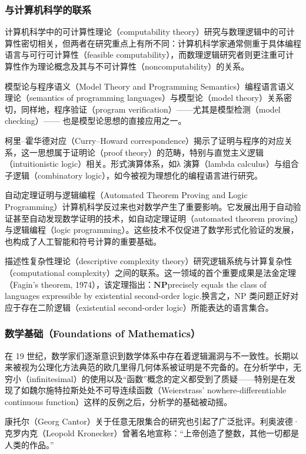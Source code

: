 \subsubsection{与计算机科学的联系}
计算机科学中的可计算性理论（computability theory）研究与数理逻辑中的可计算性密切相关，但两者在研究重点上有所不同：计算机科学家通常侧重于具体编程语言与可行可计算性（feasible computability），而数理逻辑研究者则更注重可计算性作为理论概念及其与不可计算性（noncomputability）的关系。

模型论与程序语义（Model Theory and Programming Semantics）编程语言语义理论（semantics of programming languages）与模型论（model theory）关系密切，同样地，程序验证（program verification）——尤其是模型检测（model checking）—— 也是模型论思想的直接应用之一。  

柯里–霍华德对应（Curry–Howard correspondence）揭示了证明与程序的对应关系，这一思想属于证明论（proof theory）的范畴，特别与直觉主义逻辑（intuitionistic logic）相关。形式演算体系，如λ 演算（lambda calculus）与组合子逻辑（combinatory logic），如今被视为理想化的编程语言进行研究。

自动定理证明与逻辑编程（Automated Theorem Proving and Logic Programming）计算机科学反过来也对数学产生了重要影响。它发展出用于自动验证甚至自动发现数学证明的技术，如自动定理证明（automated theorem proving）与逻辑编程（logic programming）。这些技术不仅促进了数学形式化验证的发展，也构成了人工智能和符号计算的重要基础。

描述性复杂性理论（descriptive complexity theory）研究逻辑系统与计算复杂性（computational complexity）之间的联系。这一领域的首个重要成果是法金定理（Fagin’s theorem, 1974），该定理指出：$\mathbf{NP}$precisely equals the class of languages expressible by existential second-order logic.换言之，NP 类问题正好对应于存在二阶逻辑（existential second-order logic）所能表达的语言集合。
\subsubsection{数学基础（Foundations of Mathematics）}
在 19 世纪，数学家们逐渐意识到数学体系中存在着逻辑漏洞与不一致性。长期以来被视为公理化方法典范的欧几里得几何体系被证明是不完备的。在分析学中，无穷小（infinitesimal）的使用以及“函数”概念的定义都受到了质疑——特别是在发现了如魏尔施特拉斯处处不可导连续函数（Weierstrass’ nowhere-differentiable continuous function）这样的反例之后，分析学的基础被动摇。

康托尔（Georg Cantor）关于任意无限集合的研究也引起了广泛批评。利奥波德·克罗内克（Leopold Kronecker）曾著名地宣称：“上帝创造了整数，其他一切都是人类的作品。”

